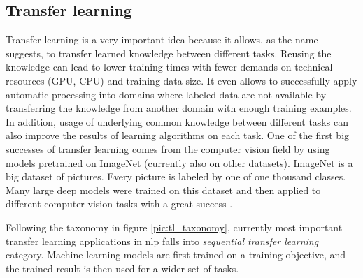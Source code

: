 \subsection{Transfer learning}
\label{sub:models}
Transfer learning is a very important idea because it allows, as the name suggests, to transfer learned knowledge between different tasks. 
Reusing the knowledge can lead to lower training times with fewer demands on technical resources (GPU, CPU) and training data size. It even allows to successfully apply automatic processing into domains where labeled data are not available by transferring the knowledge from another domain with enough training examples. In addition, usage of underlying common knowledge between different tasks can also improve the results of learning algorithms on each task. %
One of the first big successes of transfer learning comes from the computer vision field by using models pretrained on ImageNet (currently also on other datasets). ImageNet \citep{Russakovsky2015} is a big dataset of pictures. Every picture is labeled by one of one thousand classes. Many large deep models were trained on this dataset and then applied to different computer vision tasks with a great success \citep{Huh}.  %
\par
Following the taxonomy in figure \ref{pic:tl_taxonomy}, currently most important transfer learning applications in \acrshort{nlp} falls into \textit{sequential transfer learning} category. Machine learning models are first trained on a training objective, and the trained result is then used for a wider set of tasks.
